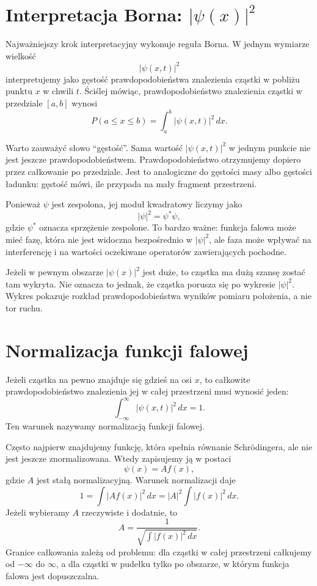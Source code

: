 \section{Interpretacja Borna: \texorpdfstring{\(|\psi(x)|^2\)}{|psi(x)|^2}}

Najważniejszy krok interpretacyjny wykonuje reguła Borna. W jednym wymiarze wielkość
\[
    |\psi(x,t)|^2
\]
interpretujemy jako gęstość prawdopodobieństwa znalezienia cząstki w pobliżu punktu \(x\) w chwili \(t\). Ściślej mówiąc, prawdopodobieństwo znalezienia cząstki w przedziale \([a,b]\) wynosi
\begin{equation}
    P(a\leq x\leq b)=\int_a^b |\psi(x,t)|^2\,dx.
\end{equation}

Warto zauważyć słowo ``gęstość''. Sama wartość \(|\psi(x,t)|^2\) w jednym punkcie nie jest jeszcze prawdopodobieństwem. Prawdopodobieństwo otrzymujemy dopiero przez całkowanie po przedziale. Jest to analogiczne do gęstości masy albo gęstości ładunku: gęstość mówi, ile przypada na mały fragment przestrzeni.

Ponieważ \(\psi\) jest zespolona, jej moduł kwadratowy liczymy jako
\[
    |\psi|^2=\psi^*\psi,
\]
gdzie \(\psi^*\) oznacza sprzężenie zespolone. To bardzo ważne: funkcja falowa może mieć fazę, która nie jest widoczna bezpośrednio w \(|\psi|^2\), ale faza może wpływać na interferencję i na wartości oczekiwane operatorów zawierających pochodne.

\begin{examplebox}
Jeżeli w pewnym obszarze \(|\psi(x)|^2\) jest duże, to cząstka ma dużą szansę zostać tam wykryta. Nie oznacza to jednak, że cząstka porusza się po wykresie \(|\psi|^2\). Wykres pokazuje rozkład prawdopodobieństwa wyników pomiaru położenia, a nie tor ruchu.
\end{examplebox}

\section{Normalizacja funkcji falowej}

Jeżeli cząstka na pewno znajduje się gdzieś na osi \(x\), to całkowite prawdopodobieństwo znalezienia jej w całej przestrzeni musi wynosić jeden:
\begin{equation}
    \int_{-\infty}^{\infty}|\psi(x,t)|^2\,dx=1.
\end{equation}
Ten warunek nazywamy normalizacją funkcji falowej.

Często najpierw znajdujemy funkcję, która spełnia równanie Schrödingera, ale nie jest jeszcze znormalizowana. Wtedy zapisujemy ją w postaci
\[
    \psi(x)=A f(x),
\]
gdzie \(A\) jest stałą normalizacyjną. Warunek normalizacji daje
\[
    1=\int |A f(x)|^2\,dx=|A|^2\int |f(x)|^2\,dx.
\]
Jeżeli wybieramy \(A\) rzeczywiste i dodatnie, to
\begin{equation}
    A=\frac{1}{\sqrt{\int |f(x)|^2\,dx}}.
\end{equation}
Granice całkowania zależą od problemu: dla cząstki w całej przestrzeni całkujemy od \(-\infty\) do \(\infty\), a dla cząstki w pudełku tylko po obszarze, w którym funkcja falowa jest dopuszczalna.

